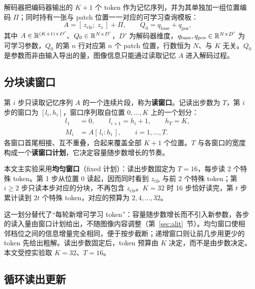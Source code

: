解码器把编码器输出的 $K+1$ 个 token 作为记忆序列，并为其单独加一组位置编码 $\Pi$；同时持有一张与 patch 位置一一对应的可学习查询模板：
\begin{equation}
A=[\,z_{\mathrm{cls}};\;z_s\,]+\Pi,\qquad
Q_0=q_{\mathrm{base}}+q_{\mathrm{pos}},
\label{eq:memory}
\end{equation}
其中 $A\in\mathbb{R}^{(K+1)\times D'}$、$Q_0\in\mathbb{R}^{N\times D'}$，$D'$ 为解码器维度，$q_{\mathrm{base}},q_{\mathrm{pos}}\in\mathbb{R}^{N\times D'}$ 为可学习参数，$Q_0$ 的第 $n$ 行对应第 $n$ 个 patch 位置，行数恒为 $N$、与 $K$ 无关。$Q_0$ 是参数而非由输入导出的量，图像信息只能通过读取记忆 $A$ 进入解码过程。

\subsection{\heiti 分块读窗口}
\label{sec:window}

第 $i$ 步只读取记忆序列 $A$ 的一个连续片段，称为\textbf{读窗口}。记读出步数为 $T$，第 $i$ 步的窗口为 $[l_i,h_i]$，窗口序列取自位置 $0,\dots,K$ 上的一个划分：
\begin{equation}
\begin{aligned}
l_1&=0,\qquad l_{i+1}=h_i+1,\qquad h_T=K,\\
M_i&=A[\,l_i:h_i\,],\qquad i=1,\dots,T.
\end{aligned}
\label{eq:window}
\end{equation}
各窗口首尾相接、互不重叠，合起来覆盖全部 $K+1$ 个位置。$T$ 与各窗口的宽度构成一个\textbf{读窗口计划}，它决定容量随步数增长的节奏。

本文主实验采用\textbf{均匀窗口}（fixed 计划）：读出步数固定为 $T=16$，每步读 2 个特殊 token。第 1 步从位置 0 读起，因而同时看到 $z_{\mathrm{cls}}$ 与前 2 个特殊 token；第 $i\ge2$ 步只读本步对应的分块，不再包含 $z_{\mathrm{cls}}$。$K=32$ 时 16 步恰好读完，第 $t$ 步累计读到 $2t$ 个特殊 token，对应的预算为 $2,4,\dots,32$。

这一划分替代了“每轮新增可学习 token”：容量随步数增长而不引入新参数，各步的读入量由窗口计划给出，不随图像内容调整（第~\ref{sec:alit}~节）。均匀窗口使相邻档位之间的信息增量完全相同，便于按步截断；递增窗口则让前几步用更少的 token 先给出粗解。读出步数固定后，token 预算由 $K$ 决定，而不是由步数决定。本文受控实验取 $K=32$、$T=16$。

\subsection{\heiti 循环读出更新}
\label{sec:recurrent}

